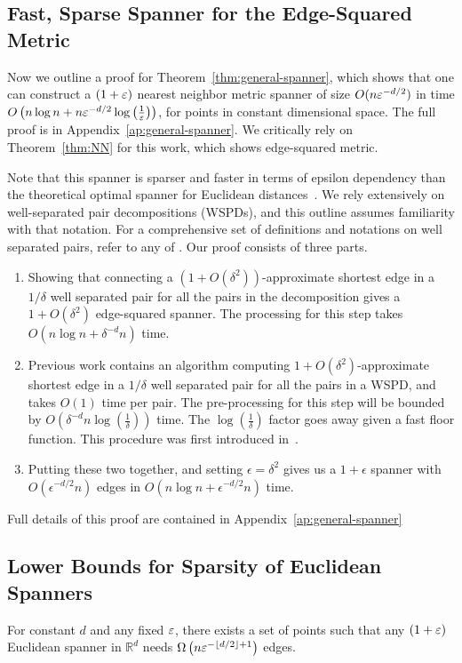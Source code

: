 \subsection{Fast, Sparse Spanner for the Edge-Squared
Metric}
\label{sec:general-spanner}

Now we outline a proof for Theorem~\ref{thm:general-spanner}, which shows
that one can construct a $(1+\varepsilon)$ nearest neighbor metric spanner of size
$O(n \varepsilon^{-d/2})$ in
time $O\left(n \log n + n \varepsilon^{-d/2} \log \left(\frac{1}{\varepsilon}\right)\right)$, 
for points in constant dimensional space. The full proof is in
Appendix~\ref{ap:general-spanner}. We critically rely on
Theorem~\ref{thm:NN} for this work, which shows
edge-squared metric.

Note that this spanner is sparser and faster in terms of epsilon dependency
than the theoretical optimal spanner for Euclidean distances~\cite{}.
We rely extensively on well-separated pair decompositions
(WSPDs),
and this outline assumes familiarity with that notation.
For a comprehensive set of definitions and notations on well separated
pairs, refer to any of \cite{Callahan1995, Arya2016, Callahan1993,
arya95euclid}.  
Our proof consists of three parts.
\begin{enumerate}
\item Showing that connecting a $(1+O(\delta^2))$-approximate shortest edge
in a $1/\delta$ well separated pair for all the pairs in the decomposition
gives a $1+O(\delta^2)$ edge-squared spanner.
The processing for this step takes $O(n \log n + \delta^{-d}n)$ time.
\item Previous work contains an algorithm computing
  $1+O(\delta^2)$-approximate shortest edge in a $1/\delta$ well
    separated pair for all the pairs in a WSPD, and takes
    $O(1)$ time per pair. The pre-processing for this step will be
    bounded by $O(\delta^{-d}n\log\left(\frac{1}{\delta}\right))$ time. The $\log\left(\frac{1}{\delta}\right)$ factor goes away given a fast floor function. 
    This procedure was first introduced in~\cite{Callahan1995}.

\item Putting these two together, and setting $\epsilon = \delta^2$
gives us a $1+\epsilon$ spanner with
$O(\epsilon^{-d/2}n)$ edges in
    $O(n \log n + \epsilon^{-d/2}n)$ time.
\end{enumerate}
Full details of this proof are contained in Appendix~\ref{ap:general-spanner}

\subsection{Lower Bounds for Sparsity of Euclidean
Spanners}\label{sec:lower-bound}
\begin{theorem} \label{thm:euc} For constant $d$ and any fixed $\varepsilon$, there exists a set
of points such that any $(1+\varepsilon)$ Euclidean spanner in $\mathbb{R}^d$
  needs $\Omega\left(n
  \varepsilon^{-\lfloor d/2\rfloor + 1}\right)$ edges.
\end{theorem}
